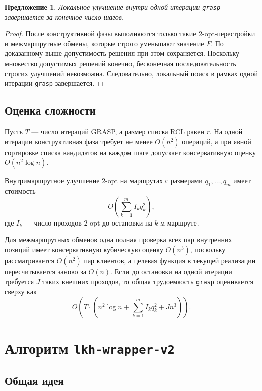 \documentclass[a4paper,12pt]{article}
\newtheorem{proposition}{Предложение}[section]
\newcommand{\obj}{F}
\begin{document}
\begin{proposition}
Локальное улучшение внутри одной итерации \texttt{grasp} завершается за конечное число
шагов.
\end{proposition}

\begin{proof}
После конструктивной фазы выполняются только такие 2-opt-перестройки и межмаршрутные
обмены, которые строго уменьшают значение \(\obj\). По доказанному выше допустимость решения
при этом сохраняется. Поскольку множество допустимых решений конечно, бесконечная
последовательность строгих улучшений невозможна. Следовательно, локальный поиск в рамках
одной итерации \texttt{grasp} завершается.
\end{proof}

\subsection{Оценка сложности}

Пусть \(T\) --- число итераций GRASP, а размер списка RCL равен \(r\). На одной итерации
конструктивная фаза требует не менее \(O(n^2)\) операций, а при явной сортировке списка
кандидатов на каждом шаге допускает консервативную оценку \(O(n^2 \log n)\).

Внутримаршрутное улучшение 2-opt на маршрутах с размерами \(q_1,\dots,q_m\) имеет стоимость
\[
O\!\left(\sum_{k=1}^{m} I_k q_k^2\right),
\]
где \(I_k\) --- число проходов 2-opt до остановки на \(k\)-м маршруте.

Для межмаршрутных обменов одна полная проверка всех пар внутренних позиций имеет
консервативную кубическую оценку \(O(n^3)\), поскольку рассматривается \(O(n^2)\) пар
клиентов, а целевая функция в текущей реализации пересчитывается заново за \(O(n)\).
Если до остановки на одной итерации требуется \(J\) таких внешних проходов, то общая
трудоемкость \texttt{grasp} оценивается сверху как
\[
O\!\left(
T \cdot \left(
  n^2 \log n + \sum_{k=1}^{m} I_k q_k^2 + J n^3
\right)\right).
\]

\section{Алгоритм \texttt{lkh-wrapper-v2}}

\subsection{Общая идея}
\end{document}
